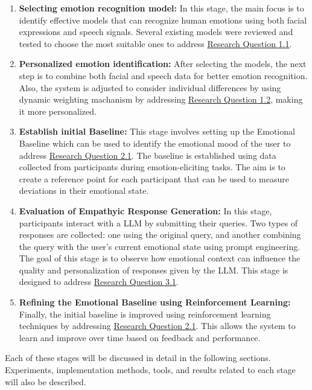 \begin{enumerate}
    \item \textbf{Selecting emotion recognition model:} In this stage, the main focus is to identify effective models that can recognize human emotions using both facial expressions and speech signals. Several existing models were reviewed and tested to choose the most suitable ones to address \hyperref[rq:1.1]{Research Question 1.1}. 

    \item \textbf{Personalized emotion identification:} After selecting the models, the next step is to combine both facial and speech data for better emotion recognition. Also, the system is adjusted to consider individual differences by using dynamic weighting machanism by addressing \hyperref[rq:1.2]{Research Question 1.2}, making it more personalized.

    \item \textbf{Establish initial Baseline:} This stage involves setting up the Emotional Baseline which can be used to identify the emotional mood of the user to address \hyperref[rq:2.1]{Research Question 2.1}. The baseline is established using data collected from participants during emotion-eliciting tasks. The aim is to create a reference point for each participant that can be used to measure deviations in their emotional state.

    \item \textbf{Evaluation of Empathyic Response Generation:} In this stage, participants interact with a LLM by submitting their queries. Two types of responses are collected: one using the original query, and another combining the query with the user's current emotional state using prompt engineering. The goal of this stage is to observe how emotional context can influence the quality and personalization of responses given by the LLM. This stage is designed to address \hyperref[rq:3.1]{Research Question 3.1}.


    \item \textbf{Refining the Emotional Baseline using Reinforcement Learning:} Finally, the initial baseline is improved using reinforcement learning techniques by addressing \hyperref[rq:2.1]{Research Question 2.1}. This allows the system to learn and improve over time based on feedback and performance.

\end{enumerate}

Each of these stages will be discussed in detail in the following sections. Experiments, implementation methods, tools, and results related to each stage will also be described.

